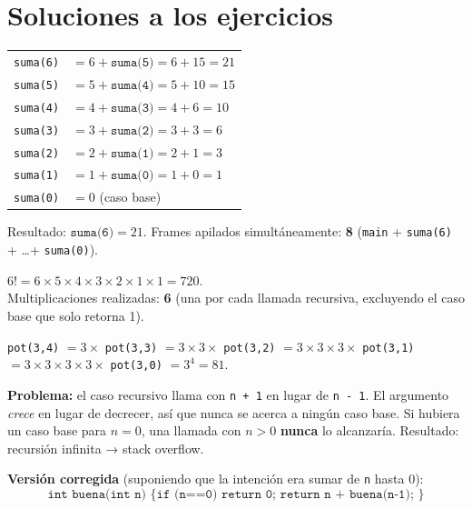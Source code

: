 \documentclass[12pt, oneside]{article}
\begin{document}
\section{Soluciones a los ejercicios}

\begin{notaprofesor}
  \begin{center}
  \begin{tabular}{ll}
    \texttt{suma(6)} & $= 6 + \texttt{suma(5)} = 6 + 15 = 21$ \\
    \texttt{suma(5)} & $= 5 + \texttt{suma(4)} = 5 + 10 = 15$ \\
    \texttt{suma(4)} & $= 4 + \texttt{suma(3)} = 4 + 6 = 10$ \\
    \texttt{suma(3)} & $= 3 + \texttt{suma(2)} = 3 + 3 = 6$ \\
    \texttt{suma(2)} & $= 2 + \texttt{suma(1)} = 2 + 1 = 3$ \\
    \texttt{suma(1)} & $= 1 + \texttt{suma(0)} = 1 + 0 = 1$ \\
    \texttt{suma(0)} & $= 0$ \quad (caso base) \\
  \end{tabular}
  \end{center}
  Resultado: $\texttt{suma(6)} = 21$.
  Frames apilados simultáneamente: \textbf{8}
  (\texttt{main} + \texttt{suma(6)} + \ldots + \texttt{suma(0)}).
\end{notaprofesor}

\begin{notaprofesor}
  $6! = 6 \times 5 \times 4 \times 3 \times 2 \times 1 \times 1 = 720$.\\
  Multiplicaciones realizadas: \textbf{6} (una por cada llamada
  recursiva, excluyendo el caso base que solo retorna 1).
\end{notaprofesor}

\begin{notaprofesor}
  \texttt{pot(3,4)} $= 3 \times$ \texttt{pot(3,3)}
  $= 3 \times 3 \times$ \texttt{pot(3,2)}
  $= 3 \times 3 \times 3 \times$ \texttt{pot(3,1)}
  $= 3 \times 3 \times 3 \times 3 \times$ \texttt{pot(3,0)}
  $= 3^4 = 81$. \checkmark
\end{notaprofesor}

\begin{notaprofesor}
  \textbf{Problema:} el caso recursivo llama con \texttt{n + 1} en lugar
  de \texttt{n - 1}.  El argumento \textit{crece} en lugar de decrecer,
  así que nunca se acerca a ningún caso base.  Si hubiera un caso base
  para $n = 0$, una llamada con $n > 0$ \textbf{nunca} lo alcanzaría.
  Resultado: recursión infinita → stack overflow.

  \textbf{Versión corregida} (suponiendo que la intención era sumar
  de \texttt{n} hasta 0):
  \[
    \texttt{int buena(int n) \{ if (n==0) return 0; return n + buena(n-1); \}}
  \]
\end{notaprofesor}
\end{document}
